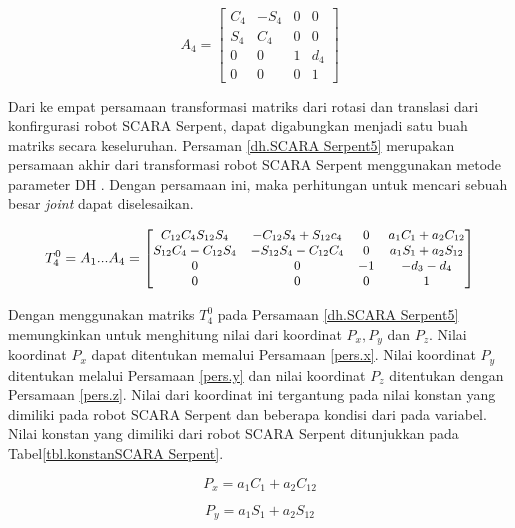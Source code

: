 \begin{equation}
A_{4} = \begin{bmatrix}
C_{4} &  -S_{4}&  0& 0\\ 
S_{4}&  C_{4}&  0& 0\\ 
0&0  &1  &d_{4} \\ 
0 & 0 & 0 &1 
\end{bmatrix}
\label{dh.SCARA Serpent4}
\end{equation}

Dari ke empat persamaan transformasi matriks dari rotasi dan translasi dari konfirgurasi robot SCARA Serpent, dapat digabungkan menjadi satu buah matriks secara keseluruhan. Persaman \ref{dh.SCARA Serpent5} merupakan persamaan akhir dari transformasi robot SCARA Serpent menggunakan metode parameter DH . Dengan persamaan ini, maka perhitungan untuk mencari sebuah besar \textit{joint} dapat diselesaikan.

\begin{equation}
\small
T_{4}^{0}=A_{1} ... A_{4} =
\begin{bmatrix}
C_{12}C_{4}S_{12}S_{4}&-C_{12}S_{4}+S_{12}c_{4}  & 0  & a_{1}C_{1}+a_{2}C_{12} \\ 
S_{12}C_{4}-C_{12}S_{4}&-S_{12}S_{4}-C_{12}C_{4} &0  &a_{1}S_{1}+a_{2}S_{12} \\ 
0 & 0 & -1 & -d_{3}-d_{4}\\ 
0 &0  &0  &1 
\end{bmatrix}
\label{dh.SCARA Serpent5}
\end{equation}

Dengan menggunakan matriks $T_{4}^{0}$ pada Persamaan \ref{dh.SCARA Serpent5} memungkinkan untuk menghitung nilai dari koordinat $P_{x}, P_{y}$ dan $P_{z}$. Nilai koordinat $P_{x}$ dapat ditentukan memalui Persamaan \ref{pers.x}. Nilai koordinat $P_{y}$ ditentukan melalui Persamaan \ref{pers.y} dan nilai koordinat $P_{z}$ ditentukan dengan Persamaan \ref{pers.z}. Nilai dari koordinat ini tergantung pada nilai konstan yang dimiliki pada robot SCARA Serpent dan beberapa kondisi dari pada variabel. Nilai konstan yang dimiliki dari robot SCARA Serpent ditunjukkan pada Tabel\ref{tbl.konstanSCARA Serpent}.

\begin{equation}
P_{x}=a_{1}C_{1}+a_{2}C_{12}
\label{pers.x}
\end{equation}

\begin{equation}
P_{y}=a_{1}S_{1}+a_{2}S_{12}
\label{pers.y}
\end{equation}

